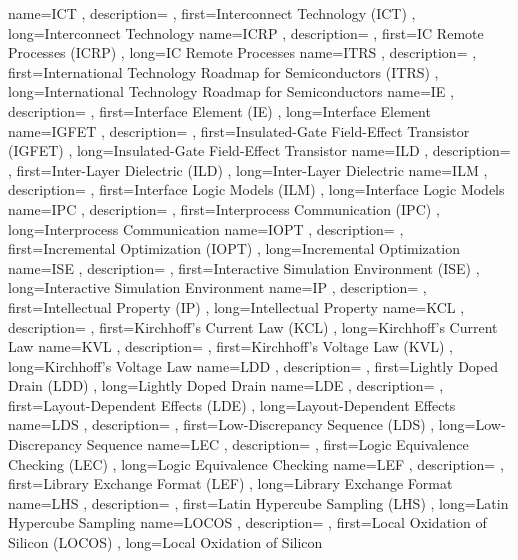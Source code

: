{ name={ICT}
, description={}
, first={Interconnect Technology (ICT)}
, long={Interconnect Technology}
}
{ name={ICRP}
, description={}
, first={IC Remote Processes (ICRP)}
, long={IC Remote Processes}
}
{ name={ITRS}
, description={}
, first={International Technology Roadmap for Semiconductors (ITRS)}
, long={International Technology Roadmap for Semiconductors}
}
{ name={IE}
, description={}
, first={Interface Element (IE)}
, long={Interface Element}
}
{ name={IGFET}
, description={}
, first={Insulated-Gate Field-Effect Transistor (IGFET)}
, long={Insulated-Gate Field-Effect Transistor}
}
{ name={ILD}
, description={}
, first={Inter-Layer Dielectric (ILD)}
, long={Inter-Layer Dielectric}
}
{ name={ILM}
, description={}
, first={Interface Logic Models (ILM)}
, long={Interface Logic Models}
}
{ name={IPC}
, description={}
, first={Interprocess Communication (IPC)}
, long={Interprocess Communication}
}
{ name={IOPT}
, description={}
, first={Incremental Optimization (IOPT)}
, long={Incremental Optimization}
}
{ name={ISE}
, description={}
, first={Interactive Simulation Environment (ISE)}
, long={Interactive Simulation Environment}
}
{ name={IP}
, description={}
, first={Intellectual Property (IP)}
, long={Intellectual Property}
}
{ name={KCL}
, description={}
, first={Kirchhoff’s Current Law (KCL)}
, long={Kirchhoff’s Current Law}
}
{ name={KVL}
, description={}
, first={Kirchhoff’s Voltage Law (KVL)}
, long={Kirchhoff’s Voltage Law}
}
{ name={LDD}
, description={}
, first={Lightly Doped Drain (LDD)}
, long={Lightly Doped Drain}
}
{ name={LDE}
, description={}
, first={Layout-Dependent Effects (LDE)}
, long={Layout-Dependent Effects}
}
{ name={LDS}
, description={}
, first={Low-Discrepancy Sequence (LDS)}
, long={Low-Discrepancy Sequence}
}
{ name={LEC}
, description={}
, first={Logic Equivalence Checking (LEC)}
, long={Logic Equivalence Checking}
}
{ name={LEF}
, description={}
, first={Library Exchange Format (LEF)}
, long={Library Exchange Format}
}
{ name={LHS}
, description={}
, first={Latin Hypercube Sampling (LHS)}
, long={Latin Hypercube Sampling}
}
{ name={LOCOS}
, description={}
, first={Local Oxidation of Silicon (LOCOS)}
, long={Local Oxidation of Silicon}
}
